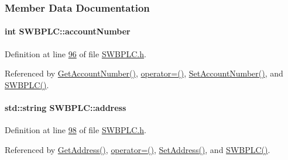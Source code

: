\subsubsection{Member Data Documentation}
\paragraph[{\texorpdfstring{account\+Number}{accountNumber}}]{\setlength{\rightskip}{0pt plus 5cm}int S\+W\+B\+P\+L\+C\+::account\+Number\hspace{0.3cm}{\ttfamily [private]}}\hypertarget{class_s_w_b_p_l_c_a5d03f989254b88bdb7eb3deeec7e4217_a5d03f989254b88bdb7eb3deeec7e4217}{}\label{class_s_w_b_p_l_c_a5d03f989254b88bdb7eb3deeec7e4217_a5d03f989254b88bdb7eb3deeec7e4217}


Definition at line \hyperlink{_s_w_b_p_l_c_8h_source_l00096}{96} of file \hyperlink{_s_w_b_p_l_c_8h_source}{S\+W\+B\+P\+L\+C.\+h}.



Referenced by \hyperlink{_s_w_b_p_l_c_8cpp_source_l00077}{Get\+Account\+Number()}, \hyperlink{_s_w_b_p_l_c_8h_source_l00063}{operator=()}, \hyperlink{_s_w_b_p_l_c_8cpp_source_l00073}{Set\+Account\+Number()}, and \hyperlink{_s_w_b_p_l_c_8h_source_l00024}{S\+W\+B\+P\+L\+C()}.

\paragraph[{\texorpdfstring{address}{address}}]{\setlength{\rightskip}{0pt plus 5cm}std\+::string S\+W\+B\+P\+L\+C\+::address\hspace{0.3cm}{\ttfamily [private]}}\hypertarget{class_s_w_b_p_l_c_a86edad3cbbc5903c8ab8a45b22c0dd15_a86edad3cbbc5903c8ab8a45b22c0dd15}{}\label{class_s_w_b_p_l_c_a86edad3cbbc5903c8ab8a45b22c0dd15_a86edad3cbbc5903c8ab8a45b22c0dd15}


Definition at line \hyperlink{_s_w_b_p_l_c_8h_source_l00098}{98} of file \hyperlink{_s_w_b_p_l_c_8h_source}{S\+W\+B\+P\+L\+C.\+h}.



Referenced by \hyperlink{_s_w_b_p_l_c_8cpp_source_l00061}{Get\+Address()}, \hyperlink{_s_w_b_p_l_c_8h_source_l00063}{operator=()}, \hyperlink{_s_w_b_p_l_c_8cpp_source_l00057}{Set\+Address()}, and \hyperlink{_s_w_b_p_l_c_8h_source_l00024}{S\+W\+B\+P\+L\+C()}.

